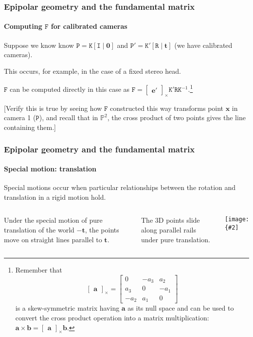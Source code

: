\documentclass[aspectratio=169]{beamer}
\renewcommand{\vec}[1]{\boldsymbol{#1}}
\newcommand{\mat}[1]{\mathtt{#1}}
\newcommand{\crossmat}[1]{\begin{bmatrix} #1 \end{bmatrix}_{\times}}
\def\Pset{\mathbb{P}}
\newcommand{\myfig}[3]{\centerline{\texttt{[image: \{\#2]}}}
    \centerline{\scriptsize #3}}
\begin{document}
\begin{frame}
\frametitle{Epipolar geometry and the fundamental matrix}
\framesubtitle{Computing $\mat{F}$ for calibrated cameras}

Suppose we know know $\mat{P}=\mat{K}[\mat{I}\mid \vec{0}]$ and
$\mat{P}'=\mat{K}'[\mat{R}\mid \vec{t}]$ (we have calibrated cameras).

\medskip

This occurs, for example, in the case of a fixed stereo head.

\medskip

$\mat{F}$ can be computed \alert{directly} in this case as
$\mat{F}=\crossmat{\vec{e}'}\mat{K}'\mat{R}\mat{K}^{-1}$.\footnote{Remember
  that
\begin{equation*}
  \crossmat{\vec{a}}=\begin{bmatrix} 0 & -a_3 & a_2 \\
    a_3 & 0 & -a_1 \\ -a_2 & a_1 & 0 \end{bmatrix}
\end{equation*}
is a skew-symmetric matrix having $\vec{a}$ as its null space and can
be used to convert the cross product operation into a matrix
multiplication: $\vec{a} \times \vec{b} = \crossmat{\vec{a}}\vec{b}$.}

\medskip

[Verify this is true by seeing how $\mat{F}$ constructed this way
 transforms point $\vec{x}$ in camera 1 ($\mat{P}$), and recall
 that in $\Pset^2$,
 the cross product of two points gives the line containing them.]

\end{frame}


\begin{frame}
\frametitle{Epipolar geometry and the fundamental matrix}
\framesubtitle{Special motion: translation}

\alert{Special motions} occur when particular relationships between
the rotation and translation in a rigid motion hold.

\medskip

\begin{columns}
\column{2in}
Under the special motion of \alert{pure translation} of the world
$-\vec{t}$, the points move on \alert{straight lines parallel to
  $\vec{t}$}.

\medskip

The 3D points slide along parallel rails under pure translation.

\column{2.3in}
\myfig{2.2in}{HZ-fig8-7}{Hartley and Zisserman (2004), Fig. 9.7}

\end{columns}

\end{frame}
\end{document}
